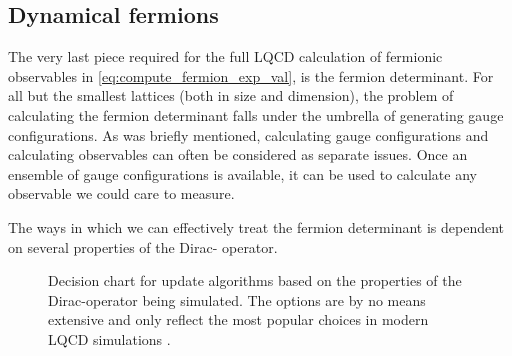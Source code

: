 \documentclass[a4paper,10pt]{book}
\begin{document}
\subsection{Dynamical fermions}
The very last piece required for the full LQCD calculation of fermionic observables in \eqref{eq:compute_fermion_exp_val}, is the fermion determinant. For all but the smallest lattices (both in size and dimension), the problem of calculating the fermion determinant falls under the umbrella of generating gauge configurations. As was briefly mentioned, calculating gauge configurations and calculating observables can often be considered as separate issues. Once an ensemble of gauge configurations is available, it can be used to calculate any observable we could care to measure.

The ways in which we can effectively treat the fermion determinant is dependent on several properties of the Dirac- operator.

\begin{figure}
\centering
{}
\caption[Dynamical fermions- decision chart for update algorithms]{Decision chart for update algorithms based on the properties of the Dirac-operator being simulated. The options are by no means extensive and only reflect the most popular choices in modern LQCD simulations \cite{schaefer2012status}.}
\end{figure}
\end{document}
